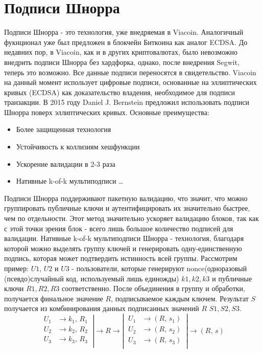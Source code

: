 \documentclass{article}
\begin{document}
\section{Подписи Шнорра}\label{sec: Schnorr signature}
Подписи Шнорра - это технология, уже внедряемая в Viacoin. Аналогичный фукнционал уже был предложен в блокчейн Биткоина как аналог ECDSA. До недавних пор, в Viacoin, как и в других криптовалютах, было невозможно внедрить подписи Шнорра без хардфорка, однако, после внедрения Segwit, теперь это возможно. Все данные подписи переносятся в свидетельство. Viacoin на данный момент использует цифровые подписи, основанные на эллиптических кривых (ECDSA) как доказательство владения, необходимое для подписи транзакции. В 2015 году Daniel J. Bernstein предложил использовать подписи Шнорра поверх эллиптических кривых.
\newline \newline
Основные преимущества:
\begin{itemize}
\item Более защищенная технология
\item Устойчивость к коллизиям хешфункции
\item Ускорение валидации в 2-3 раза
\item Нативные k-of-k мультиподписи \ldots
\end{itemize}
\noindent
Подписи Шнорра поддерживают пакетную валидацию, что значит, что можно группировать публичные ключи и аутентифицировать их значительно быстрее, чем по отдельности. Этот метод значительно ускоряет валидацию блоков, так как с этой точки зрения блок - всего лишь большое количество подписей для валидации.
\linebreak \noindent
Нативные k-of-k мультиподписи Шнорра - технология, благодаря которой можно выделять группу ключей и генерировать одну-единственную подпись, которая может подтвердить истинность всей группы. Рассмотрим пример: $U1$, $U2$ и $U3$ - пользователи, которые генерируют nonce(одноразовый (псевдо)случайный код, используемый лишь единожды) $k1, k2, k3$ и публичные ключи $R1, R2, R3 $ соответственно. После объединения в группу и обработки, получается финальное значение $R$, подписываемое каждым ключем. Результат $S$ получается из комбинирования данных подписанных значений $R$ $S1, S2, S3$.
\linebreak
\begin{equation*}
\left.
    \begin{aligned}
        U_{1} &\rightarrow k_{1},\, R_{1} \\
        U_{2} &\rightarrow k_{2},\, R_{2} \\
        U_{3} &\rightarrow k_{3},\, R_{3} \\
    \end{aligned}
\
\right|
\longrightarrow
R
\longrightarrow
\left|
\
    \begin{aligned}
        U_{1} &\rightarrow (R,\, s_{1}) \\
        U_{2} &\rightarrow (R,\, s_{2}) \\
        U_{3} &\rightarrow (R,\, s_{3}) \\
    \end{aligned}
\
\right|
\longrightarrow
(R,\, s)
\end{equation*}
\end{document}
